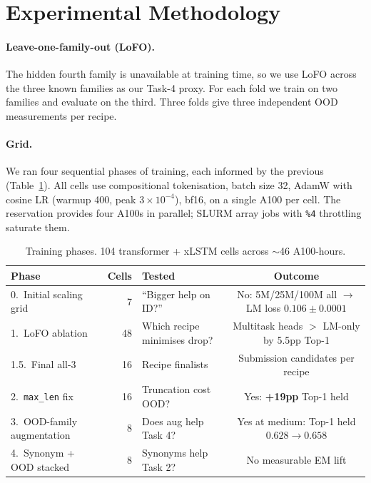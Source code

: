 \documentclass[11pt,a4paper]{article}
\begin{document}
\section{Experimental Methodology}\label{sec:methodology}

\paragraph{Leave-one-family-out (LoFO).} The hidden fourth family is unavailable at training time, so we use LoFO across the three known families as our Task-4 proxy. For each fold we train on two families and evaluate on the third. Three folds give three independent OOD measurements per recipe.

\paragraph{Grid.} We ran four sequential phases of training, each informed by the previous (Table~\ref{tab:phases}). All cells use compositional tokenisation, batch size 32, AdamW with cosine LR (warmup 400, peak $3{\times}10^{-4}$), bf16, on a single A100 per cell. The reservation provides four A100s in parallel; SLURM array jobs with \verb|%4| throttling saturate them.

\begin{table}[h]
\centering\small
\caption{Training phases. 104 transformer + xLSTM cells across $\sim$46 A100-hours.}\label{tab:phases}
\begin{tabular}{lrlc}
\toprule
Phase & Cells & Tested & Outcome \\
\midrule
0.\ Initial scaling grid & 7 & ``Bigger help on ID?'' & No: 5M/25M/100M all $\rightarrow$ LM loss $0.106\pm0.0001$ \\
1.\ LoFO ablation & 48 & Which recipe minimises drop? & Multitask heads $>$ LM-only by 5.5pp Top-1\\
1.5.\ Final all-3 & 16 & Recipe finalists & Submission candidates per recipe \\
2.\ \texttt{max\_len} fix & 16 & Truncation cost OOD? & Yes: \textbf{+19pp} Top-1 held \\
3.\ OOD-family augmentation & 8 & Does aug help Task 4? & Yes at medium: Top-1 held $0.628 \!\to\! 0.658$\\
4.\ Synonym + OOD stacked & 8 & Synonyms help Task 2? & No measurable EM lift\\
\bottomrule
\end{tabular}
\end{table}
\end{document}
